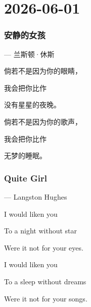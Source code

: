 \section*{2026-06-01}

\subsubsection*{安静的女孩}

\hspace{4em} --- 兰斯顿·休斯 \par
倘若不是因为你的眼睛， \par
我会把你比作 \par
没有星星的夜晚。 \par

倘若不是因为你的歌声， \par
我会把你比作 \par
无梦的睡眠。\par


\subsubsection*{Quite Girl}
\hspace{4em} --- Langston Hughes \par
I would liken you \par
To a night without star \par
Were it not for your eyes. \par
\par
I would liken you \par
To a sleep without dreams \par
Were it not for your songs. \par
